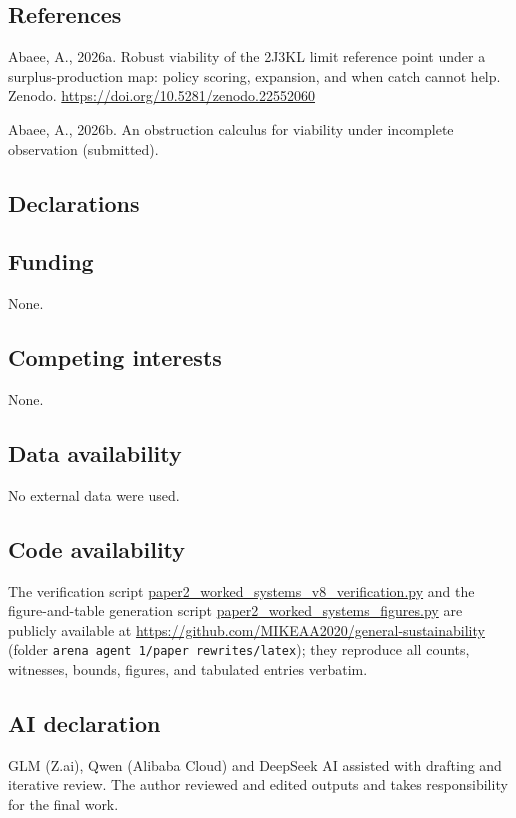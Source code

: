 \documentclass[10pt,twocolumn]{article}
\theoremstyle{definition}
\begin{document}
\subsection*{References}

Abaee, A., 2026a. Robust viability of the 2J3KL limit reference point
under a surplus-production map: policy scoring, expansion, and when
catch cannot help. Zenodo.
\url{https://doi.org/10.5281/zenodo.22552060}

Abaee, A., 2026b. An obstruction calculus for viability under
incomplete observation (submitted).

\subsection*{Declarations}

\subsection*{Funding}
None.

\subsection*{Competing interests}
None.

\subsection*{Data availability}
No external data were used.

\subsection*{Code availability}
The verification script \url{paper2_worked_systems_v8_verification.py}
and the figure-and-table generation script
\url{paper2_worked_systems_figures.py} are publicly available at
\url{https://github.com/MIKEAA2020/general-sustainability} (folder
\texttt{arena agent 1/paper rewrites/latex}); they reproduce all
counts, witnesses, bounds, figures, and tabulated entries verbatim.

\subsection*{AI declaration}
GLM (Z.ai), Qwen (Alibaba Cloud) and DeepSeek AI assisted with drafting
and iterative review. The author reviewed and edited outputs and takes
responsibility for the final work.
\end{document}

